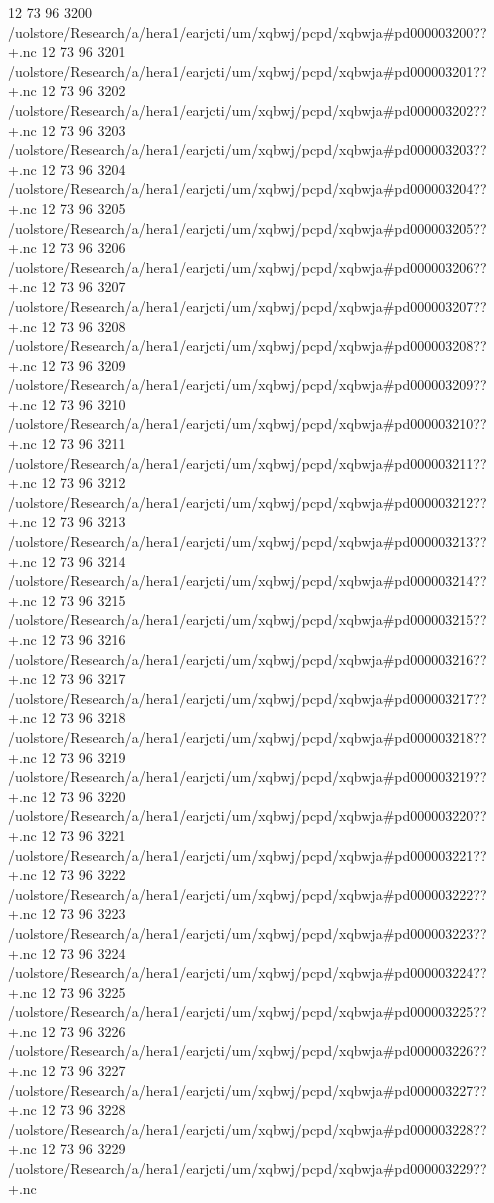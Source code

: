 12 73 96
3200
/uolstore/Research/a/hera1/earjcti/um/xqbwj/pcpd/xqbwja#pd000003200??+.nc
12 73 96
3201
/uolstore/Research/a/hera1/earjcti/um/xqbwj/pcpd/xqbwja#pd000003201??+.nc
12 73 96
3202
/uolstore/Research/a/hera1/earjcti/um/xqbwj/pcpd/xqbwja#pd000003202??+.nc
12 73 96
3203
/uolstore/Research/a/hera1/earjcti/um/xqbwj/pcpd/xqbwja#pd000003203??+.nc
12 73 96
3204
/uolstore/Research/a/hera1/earjcti/um/xqbwj/pcpd/xqbwja#pd000003204??+.nc
12 73 96
3205
/uolstore/Research/a/hera1/earjcti/um/xqbwj/pcpd/xqbwja#pd000003205??+.nc
12 73 96
3206
/uolstore/Research/a/hera1/earjcti/um/xqbwj/pcpd/xqbwja#pd000003206??+.nc
12 73 96
3207
/uolstore/Research/a/hera1/earjcti/um/xqbwj/pcpd/xqbwja#pd000003207??+.nc
12 73 96
3208
/uolstore/Research/a/hera1/earjcti/um/xqbwj/pcpd/xqbwja#pd000003208??+.nc
12 73 96
3209
/uolstore/Research/a/hera1/earjcti/um/xqbwj/pcpd/xqbwja#pd000003209??+.nc
12 73 96
3210
/uolstore/Research/a/hera1/earjcti/um/xqbwj/pcpd/xqbwja#pd000003210??+.nc
12 73 96
3211
/uolstore/Research/a/hera1/earjcti/um/xqbwj/pcpd/xqbwja#pd000003211??+.nc
12 73 96
3212
/uolstore/Research/a/hera1/earjcti/um/xqbwj/pcpd/xqbwja#pd000003212??+.nc
12 73 96
3213
/uolstore/Research/a/hera1/earjcti/um/xqbwj/pcpd/xqbwja#pd000003213??+.nc
12 73 96
3214
/uolstore/Research/a/hera1/earjcti/um/xqbwj/pcpd/xqbwja#pd000003214??+.nc
12 73 96
3215
/uolstore/Research/a/hera1/earjcti/um/xqbwj/pcpd/xqbwja#pd000003215??+.nc
12 73 96
3216
/uolstore/Research/a/hera1/earjcti/um/xqbwj/pcpd/xqbwja#pd000003216??+.nc
12 73 96
3217
/uolstore/Research/a/hera1/earjcti/um/xqbwj/pcpd/xqbwja#pd000003217??+.nc
12 73 96
3218
/uolstore/Research/a/hera1/earjcti/um/xqbwj/pcpd/xqbwja#pd000003218??+.nc
12 73 96
3219
/uolstore/Research/a/hera1/earjcti/um/xqbwj/pcpd/xqbwja#pd000003219??+.nc
12 73 96
3220
/uolstore/Research/a/hera1/earjcti/um/xqbwj/pcpd/xqbwja#pd000003220??+.nc
12 73 96
3221
/uolstore/Research/a/hera1/earjcti/um/xqbwj/pcpd/xqbwja#pd000003221??+.nc
12 73 96
3222
/uolstore/Research/a/hera1/earjcti/um/xqbwj/pcpd/xqbwja#pd000003222??+.nc
12 73 96
3223
/uolstore/Research/a/hera1/earjcti/um/xqbwj/pcpd/xqbwja#pd000003223??+.nc
12 73 96
3224
/uolstore/Research/a/hera1/earjcti/um/xqbwj/pcpd/xqbwja#pd000003224??+.nc
12 73 96
3225
/uolstore/Research/a/hera1/earjcti/um/xqbwj/pcpd/xqbwja#pd000003225??+.nc
12 73 96
3226
/uolstore/Research/a/hera1/earjcti/um/xqbwj/pcpd/xqbwja#pd000003226??+.nc
12 73 96
3227
/uolstore/Research/a/hera1/earjcti/um/xqbwj/pcpd/xqbwja#pd000003227??+.nc
12 73 96
3228
/uolstore/Research/a/hera1/earjcti/um/xqbwj/pcpd/xqbwja#pd000003228??+.nc
12 73 96
3229
/uolstore/Research/a/hera1/earjcti/um/xqbwj/pcpd/xqbwja#pd000003229??+.nc

